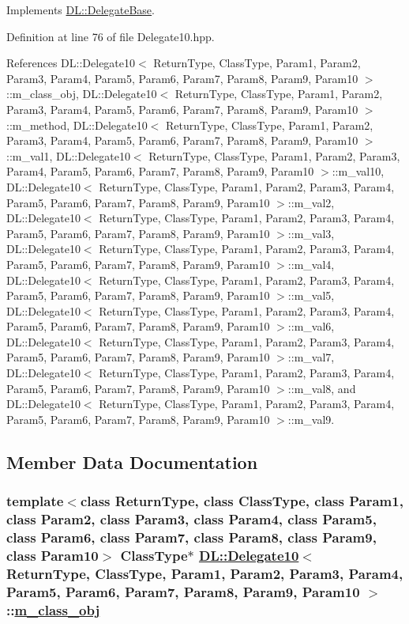 Implements \hyperlink{classDL_1_1DelegateBase_a2}{DL::Delegate\-Base}.

Definition at line 76 of file Delegate10.hpp.

References DL::Delegate10$<$ Return\-Type, Class\-Type, Param1, Param2, Param3, Param4, Param5, Param6, Param7, Param8, Param9, Param10 $>$::m\_\-class\_\-obj, DL::Delegate10$<$ Return\-Type, Class\-Type, Param1, Param2, Param3, Param4, Param5, Param6, Param7, Param8, Param9, Param10 $>$::m\_\-method, DL::Delegate10$<$ Return\-Type, Class\-Type, Param1, Param2, Param3, Param4, Param5, Param6, Param7, Param8, Param9, Param10 $>$::m\_\-val1, DL::Delegate10$<$ Return\-Type, Class\-Type, Param1, Param2, Param3, Param4, Param5, Param6, Param7, Param8, Param9, Param10 $>$::m\_\-val10, DL::Delegate10$<$ Return\-Type, Class\-Type, Param1, Param2, Param3, Param4, Param5, Param6, Param7, Param8, Param9, Param10 $>$::m\_\-val2, DL::Delegate10$<$ Return\-Type, Class\-Type, Param1, Param2, Param3, Param4, Param5, Param6, Param7, Param8, Param9, Param10 $>$::m\_\-val3, DL::Delegate10$<$ Return\-Type, Class\-Type, Param1, Param2, Param3, Param4, Param5, Param6, Param7, Param8, Param9, Param10 $>$::m\_\-val4, DL::Delegate10$<$ Return\-Type, Class\-Type, Param1, Param2, Param3, Param4, Param5, Param6, Param7, Param8, Param9, Param10 $>$::m\_\-val5, DL::Delegate10$<$ Return\-Type, Class\-Type, Param1, Param2, Param3, Param4, Param5, Param6, Param7, Param8, Param9, Param10 $>$::m\_\-val6, DL::Delegate10$<$ Return\-Type, Class\-Type, Param1, Param2, Param3, Param4, Param5, Param6, Param7, Param8, Param9, Param10 $>$::m\_\-val7, DL::Delegate10$<$ Return\-Type, Class\-Type, Param1, Param2, Param3, Param4, Param5, Param6, Param7, Param8, Param9, Param10 $>$::m\_\-val8, and DL::Delegate10$<$ Return\-Type, Class\-Type, Param1, Param2, Param3, Param4, Param5, Param6, Param7, Param8, Param9, Param10 $>$::m\_\-val9.

\subsection{Member Data Documentation}
\hypertarget{classDL_1_1Delegate10_r0}{
\subsubsection[m\_\-class\_\-obj]{\setlength{\rightskip}{0pt plus 5cm}template$<$class Return\-Type, class Class\-Type, class Param1, class Param2, class Param3, class Param4, class Param5, class Param6, class Param7, class Param8, class Param9, class Param10$>$ Class\-Type$\ast$ \hyperlink{classDL_1_1Delegate10}{DL::Delegate10}$<$ Return\-Type, Class\-Type, Param1, Param2, Param3, Param4, Param5, Param6, Param7, Param8, Param9, Param10 $>$::\hyperlink{classDL_1_1Delegate10_r0}{m\_\-class\_\-obj}}}
\label{classDL_1_1Delegate10_r0}





